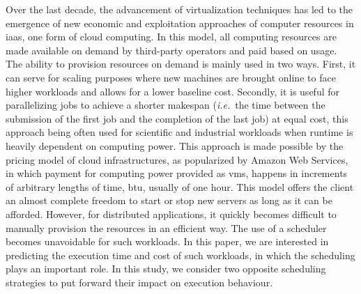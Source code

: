 \documentclass[]{llncs}
\begin{document}
Over the  last decade, the advancement  of virtualization techniques has  led to
the emergence of new economic  and exploitation approaches of computer resources
in  \ac{iaas}, one  form  of  cloud computing.   In  this  model, all  computing
resources are made  available on demand by third-party operators  and paid based
on usage.  The  ability to provision resources  on demand is mainly  used in two
ways.  First, it  can serve for scaling purposes where  new machines are brought
online to face higher workloads and allows for a lower baseline cost.
Secondly, it  is useful  for parallelizing  jobs to  achieve a  shorter makespan
(\textit{i.e.}\  the time  between  the  submission of  the  first  job and  the
completion of the  last job) at equal  cost, this approach being  often used for
scientific  and  industrial  workloads  when runtime  is  heavily  dependent  on
computing power.  This  approach is made possible by the  pricing model of cloud
infrastructures, as  popularized by Amazon Web Services, in which
payment  for computing  power provided  as \acp{vm},  happens in  increments of
arbitrary lengths of  time, \ac{btu}, usually of one hour. %
%
This model  offers the client  an almost complete freedom  to start or  stop new
servers as long as it can be afforded. However, for distributed applications, it
quickly becomes  difficult to manually  provision the resources in  an efficient
way.  The  use of a scheduler  becomes unavoidable for such  workloads.  In this
paper,  we are  interested in  predicting the  execution time  and cost  of such
workloads, in which  the scheduling plays an important role.   In this study, we
consider  two opposite  scheduling strategies  to  put forward  their impact  on
execution behaviour.
\end{document}
